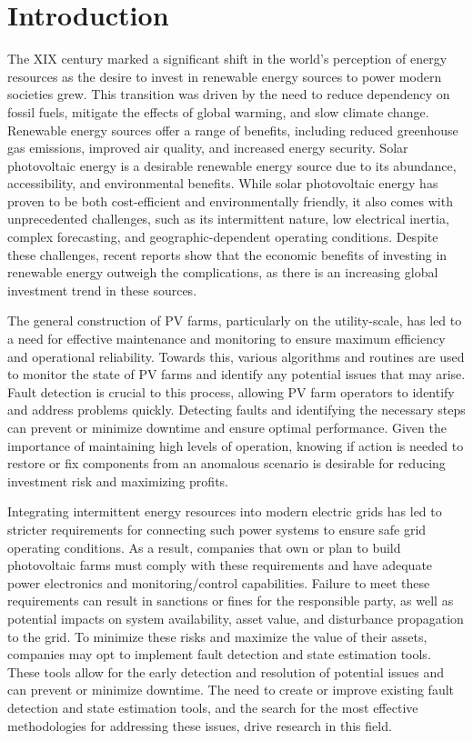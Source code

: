 \chapter{Introduction} \label{chap:chap1}


The XIX century marked a significant shift in the world's perception of energy resources as the desire to invest in renewable energy sources to power modern societies grew. This transition was driven by the need to reduce dependency on fossil fuels, mitigate the effects of global warming, and slow climate change. Renewable energy sources offer a range of benefits, including reduced greenhouse gas emissions, improved air quality, and increased energy security. Solar photovoltaic energy is a desirable renewable energy source due to its abundance, accessibility, and environmental benefits. While solar photovoltaic energy has proven to be both cost-efficient and environmentally friendly, it also comes with unprecedented challenges, such as its intermittent nature, low electrical inertia, complex forecasting, and geographic-dependent operating conditions. Despite these challenges, recent reports \cite{cap} show that the economic benefits of investing in renewable energy outweigh the complications, as there is an increasing global investment trend in these sources.

The general construction of PV farms, particularly on the utility-scale, has led to a need for effective maintenance and monitoring to ensure maximum efficiency and operational reliability. Towards this, various algorithms and routines are used to monitor the state of PV farms and identify any potential issues that may arise. Fault detection is crucial to this process, allowing PV farm operators to identify and address problems quickly. Detecting faults and identifying the necessary steps can prevent or minimize downtime and ensure optimal performance. Given the importance of maintaining high levels of operation, knowing if action is needed to restore or fix components from an anomalous scenario is desirable for reducing investment risk and maximizing profits.

Integrating intermittent energy resources into modern electric grids has led to stricter requirements for connecting such power systems to ensure safe grid operating conditions. As a result, companies that own or plan to build photovoltaic farms must comply with these requirements and have adequate power electronics and monitoring/control capabilities. Failure to meet these requirements can result in sanctions or fines for the responsible party, as well as potential impacts on system availability, asset value, and disturbance propagation to the grid. To minimize these risks and maximize the value of their assets, companies may opt to implement fault detection and state estimation tools. These tools allow for the early detection and resolution of potential issues and can prevent or minimize downtime. The need to create or improve existing fault detection and state estimation tools, and the search for the most effective methodologies for addressing these issues, drive research in this field.

